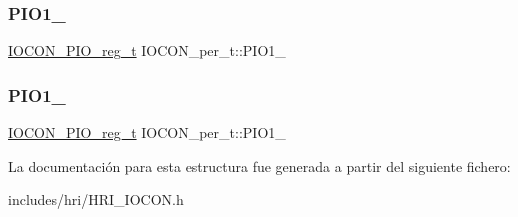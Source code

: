 \subsubsection{\texorpdfstring{P\+I\+O1\+\_}{PIO1\_11}}
{\footnotesize\ttfamily \hyperlink{structIOCON__PIO__reg__t}{I\+O\+C\+O\+N\+\_\+\+P\+I\+O\+\_\+reg\+\_\+t} I\+O\+C\+O\+N\+\_\+per\+\_\+t\+::\+P\+I\+O1\+\_}

\mbox{\label{structIOCON__per__t_a837ad45e970ca29519e14d9d4f219cb1}} 
\subsubsection{\texorpdfstring{P\+I\+O1\+\_}{PIO1\_10}}
{\footnotesize\ttfamily \hyperlink{structIOCON__PIO__reg__t}{I\+O\+C\+O\+N\+\_\+\+P\+I\+O\+\_\+reg\+\_\+t} I\+O\+C\+O\+N\+\_\+per\+\_\+t\+::\+P\+I\+O1\+\_}



La documentación para esta estructura fue generada a partir del siguiente fichero\+:\begin{DoxyCompactItemize}
\item 
includes/hri/H\+R\+I\+\_\+\+I\+O\+C\+O\+N.\+h\end{DoxyCompactItemize}
